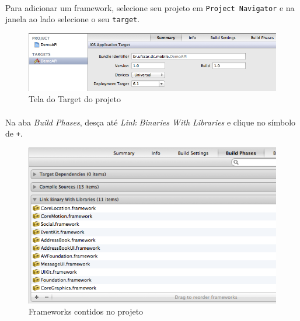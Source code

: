 \documentclass[a4paper,12pt,brazil,doubleside]{book}
\begin{document}
\begin{singlespace}
\paragraph{}Para adicionar um framework, selecione seu projeto em \texttt{Project Navigator} e na janela ao lado selecione o seu \texttt{target}.

\bigskip
\bigskip

\begin{figure}[H]
  \centering
  \includegraphics[totalheight=0.15\textheight]{figuras/framework1.png}
  \caption{Tela do Target do projeto}
  \label{fig:a}
\end{figure}

\bigskip

\paragraph{}Na aba \emph{Build Phases}, desça até \emph{Link Binaries With Libraries} e clique no símbolo de \texttt{+}.

\bigskip
\bigskip

\begin{figure}[H]
  \centering
  \includegraphics[totalheight=0.4\textheight]{figuras/framework2.png}
  \caption{Frameworks contidos no projeto}
  \label{fig:a}
\end{figure}

\bigskip


\end{singlespace}
\end{document}
